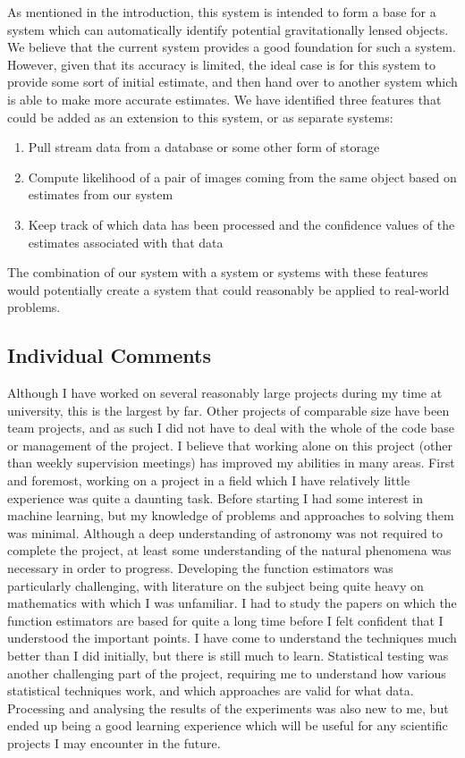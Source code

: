 \documentclass[a4paper,11pt]{article}
\begin{document}
   As mentioned in the introduction, this system is intended to form a base for
   a system which can automatically identify potential gravitationally lensed
   objects. We believe that the current system provides a good foundation for
   such a system. However, given that its accuracy is limited, the ideal case is
   for this system to provide some sort of initial estimate, and then hand over
   to another system which is able to make more accurate estimates. We have
   identified three features that could be added as an extension to this system,
   or as separate systems:
\begin{enumerate}
\item Pull stream data from a database or some other form of storage
\item Compute likelihood of a pair of images coming from the same object based on
   estimates from our system
\item Keep track of which data has been processed and the confidence
   values of the estimates associated with that data
\end{enumerate}

   The combination of our system with a system or systems with these features would
   potentially create a system that could reasonably be applied to real-world problems.
\subsection{Individual Comments}
\label{sec-9-2}

   Although I have worked on several reasonably large projects during my time at
   university, this is the largest by far. Other projects of comparable size
   have been team projects, and as such I did not have to deal with the whole of
   the code base or management of the project. I believe that working alone on
   this project (other than weekly supervision meetings) has improved my
   abilities in many areas. First and foremost, working on a project in a field
   which I have relatively little experience was quite a daunting task. Before
   starting I had some interest in machine learning, but my knowledge of
   problems and approaches to solving them was minimal. Although a deep
   understanding of astronomy was not required to complete the project, at least
   some understanding of the natural phenomena was necessary in order to
   progress. Developing the function estimators was particularly challenging,
   with literature on the subject being quite heavy on mathematics with which I
   was unfamiliar. I had to study the papers on which the function estimators
   are based for quite a long time before I felt confident that I understood the
   important points. I have come to understand the techniques much better than I
   did initially, but there is still much to learn. Statistical testing was
   another challenging part of the project, requiring me to understand how
   various statistical techniques work, and which approaches are valid for what
   data. Processing and analysing the results of the experiments was also new to
   me, but ended up being a good learning experience which will be useful for
   any scientific projects I may encounter in the future.
\end{document}
